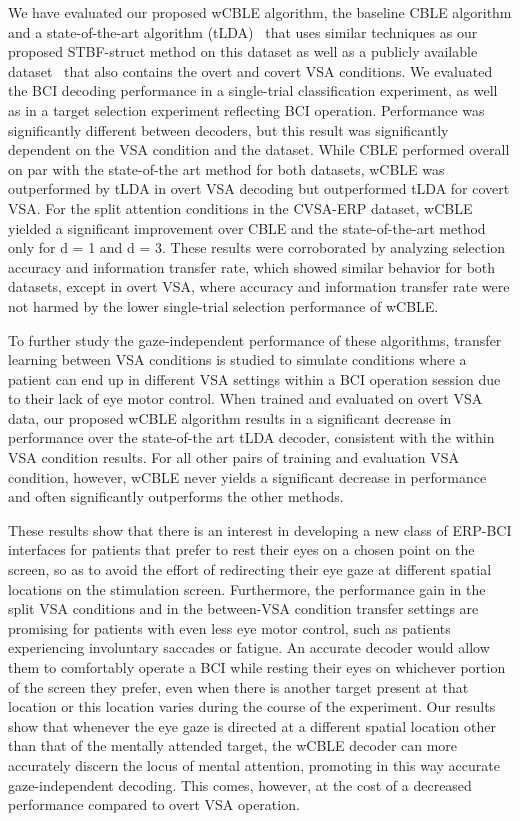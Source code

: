 We have evaluated our proposed wCBLE algorithm, the baseline CBLE algorithm and
a state-of-the-art algorithm (tLDA)~\cite{Sosulski2022} that uses similar techniques as our
proposed STBF-struct method on this dataset as well as a publicly available
dataset~\cite{Aloise2012} that also contains the overt and covert VSA conditions.
We evaluated the BCI decoding performance in a single-trial classification experiment,
as well as in a target selection experiment reflecting BCI operation.
Performance was significantly different between decoders, but this
result was significantly dependent on the VSA condition and the dataset.
While CBLE performed overall on par with the state-of-the art method for both datasets, wCBLE was
outperformed by tLDA in overt VSA decoding but outperformed
tLDA for covert VSA.
For the split attention conditions in the CVSA-ERP
dataset, wCBLE yielded a significant improvement over CBLE and the
state-of-the-art method only for d = 1 and d = 3.
These results were corroborated by analyzing selection accuracy and information
transfer rate, which showed similar behavior for both datasets, except in overt
VSA, where accuracy and information transfer rate were not harmed by the lower
single-trial selection performance of wCBLE.

To further study the gaze-independent performance of these algorithms, transfer
learning between VSA conditions is studied to simulate conditions where a patient
can end up in different VSA settings within a BCI operation session due to their
lack of eye motor control.
When trained and evaluated on overt VSA data, our proposed wCBLE algorithm results in a significant decrease in performance
over the state-of-the art tLDA decoder, consistent with the within VSA
condition results.
For all other pairs of training and evaluation VSA condition, however, wCBLE
never yields a significant decrease in performance and often significantly
outperforms the other methods.

These results show that there is an interest in developing a new class of ERP-BCI
interfaces for patients that prefer to rest their eyes on a chosen point on the
screen, so as to avoid the effort of redirecting their eye gaze at different spatial locations on
the stimulation screen. Furthermore, the performance gain in the split VSA conditions
and in the between-VSA condition transfer settings are promising for patients with even
less eye motor control, such as patients experiencing involuntary saccades or
fatigue. An accurate decoder would allow them to comfortably operate a BCI while
resting their eyes on whichever portion of the screen they prefer, even when there is
another target present at that location or this location varies during the course of the
experiment. Our results show that whenever the eye gaze is directed at a different
spatial location other than that of the mentally attended target, the wCBLE decoder can
more accurately discern the locus of mental attention, promoting in this way accurate
gaze-independent decoding. This comes, however, at the cost of a decreased performance
compared to overt VSA operation.

